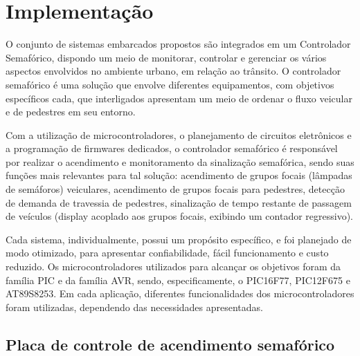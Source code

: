 \chapter{Implementação}

O conjunto de sistemas embarcados propostos são integrados em um Controlador Semafórico, dispondo um meio de monitorar, controlar e gerenciar os vários aspectos envolvidos no ambiente urbano, em relação ao trânsito. O controlador semafórico é uma solução que envolve diferentes equipamentos, com objetivos específicos cada, que interligados apresentam um meio de ordenar o fluxo veicular e de pedestres em seu entorno.

Com a utilização de microcontroladores, o planejamento de circuitos eletrônicos e a programação de firmwares dedicados, o controlador semafórico é responsável por realizar o acendimento e monitoramento da sinalização semafórica, sendo suas funções mais relevantes para tal solução: acendimento de grupos focais (lâmpadas de semáforos) veiculares, acendimento de grupos focais para pedestres, detecção de demanda de travessia de pedestres, sinalização de tempo restante de passagem de veículos (display acoplado aos grupos focais, exibindo um contador regressivo).

Cada sistema, individualmente, possui um propósito específico, e foi planejado de modo otimizado, para apresentar confiabilidade, fácil funcionamento e custo reduzido. Os microcontroladores utilizados para alcançar os objetivos foram da família PIC e da família AVR, sendo, especificamente, o PIC16F77, PIC12F675 e AT89S8253. Em cada aplicação, diferentes funcionalidades dos microcontroladores foram utilizadas, dependendo das necessidades apresentadas.


\section{Placa de controle de acendimento semafórico}

